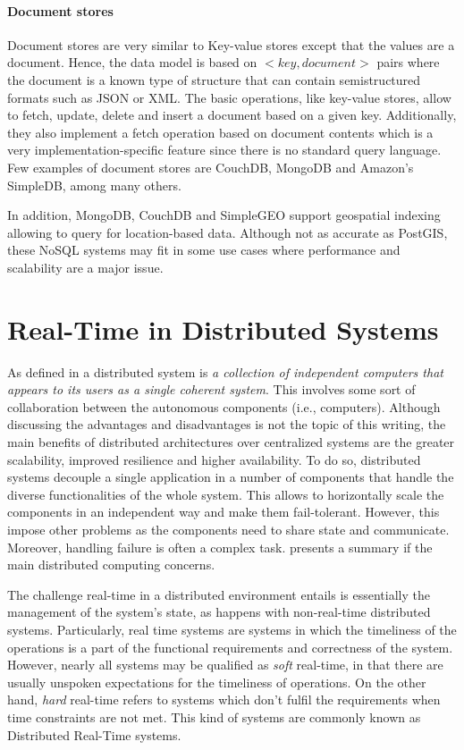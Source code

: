 \paragraph{Document stores}

Document stores are very similar to Key-value stores except that the values are a document. Hence, the data model is based on ${<key, document>}$ pairs where the document is a known type of structure that can contain semistructured formats such as JSON or XML. The basic operations, like key-value stores, allow to fetch, update, delete and insert a document based on a given key. Additionally, they also implement a fetch operation based on document contents which is a very implementation-specific feature since there is no standard query language. Few examples of document stores are CouchDB, MongoDB and Amazon's SimpleDB, among many others.  

In addition, MongoDB, CouchDB and SimpleGEO support geospatial indexing allowing to query for location-based data. Although not as accurate as PostGIS, these NoSQL systems may fit in some use cases where performance and scalability are a major issue.

\section{Real-Time in Distributed Systems}

As defined in \cite{distributed-systems-book} a distributed system is \textit{a collection of independent computers that appears to its users as a single coherent system}. This involves some sort of collaboration between the autonomous components (i.e., computers). Although discussing the advantages and disadvantages is not the topic of this writing, the main benefits of distributed architectures over centralized systems are the greater scalability, improved resilience and higher availability. To do so, distributed systems decouple a single application in a number of components that handle the diverse functionalities of the whole system. This allows to horizontally scale the components in an independent way and make them fail-tolerant. However, this impose other problems as the components need to share state and communicate. Moreover, handling failure is often a complex task. \cite{DT-fallacies} presents a summary if the main distributed computing concerns.

The challenge real-time in a distributed environment entails is essentially the management of the system's state, as happens with non-real-time distributed systems. Particularly, real time systems are systems in which the timeliness of the operations is a part of the functional requirements and correctness of the system. However, nearly all systems may be qualified as \textit{soft} real-time, in that there are usually unspoken expectations for the timeliness of operations. On the other hand, \textit{hard} real-time refers to systems which don't fulfil the requirements when time constraints are not met. This kind of systems are commonly known as Distributed Real-Time systems.

